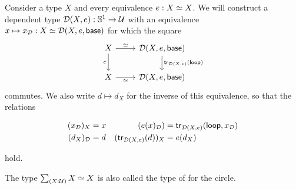\begin{defn}\label{defn:circle_descent}
Consider a type $X$ and every equivalence $e:\eqv{X}{X}$.
We will construct a dependent type $\mathcal{D}(X,e):\mathbb{S}^{1}\to\mathcal{U}$ with an equivalence $x\mapsto x_{\mathcal{D}}:\eqv{X}{\mathcal{D}(X,e,\base)}$ for which the square
\begin{equation*}
\begin{tikzcd}
X \arrow[r,"\eqvsym"] \arrow[d,swap,"e"] & \mathcal{D}(X,e,\base) \arrow[d,"\mathsf{tr}_{\mathcal{D}(X,e)}(\lloop)"] \\
X \arrow[r,swap,"\eqvsym"] & \mathcal{D}(X,e,\base)
\end{tikzcd}
\end{equation*}
commutes. We also write $d\mapsto d_{X}$ for the inverse of this equivalence, so that the relations
\begin{samepage}%
\begin{align*}
(x_{\mathcal{D}})_X & =x & (e(x)_{\mathcal{D}}) & = \mathsf{tr}_{\mathcal{D}(X,e)}(\mathsf{loop},x_{\mathcal{D}}) \\
(d_X)_{\mathcal{D}} & =d & (\mathsf{tr}_{\mathcal{D}(X,e)}(d))_X & = e(d_X)
\end{align*}
\end{samepage}%
hold.

The type $\sm{X:\UU}\eqv{X}{X}$ is also called the type of  for the circle.
\end{defn}

